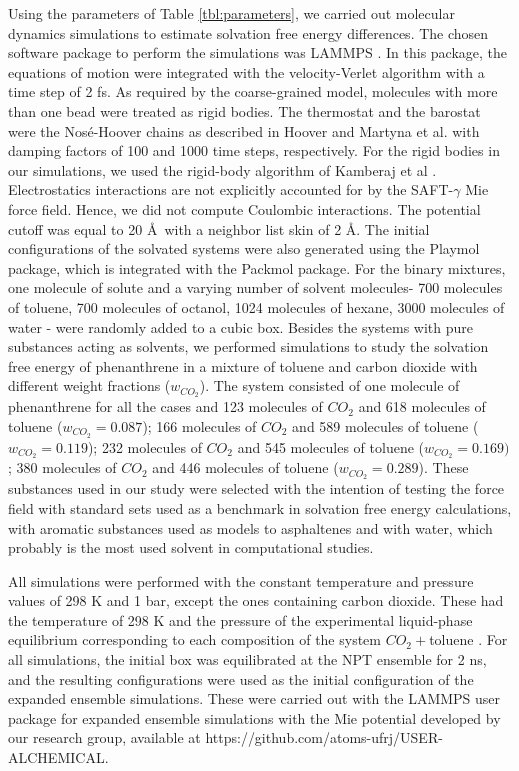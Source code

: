 \documentclass[final,12p,times,twocolumn]{elsarticle}
\begin{document}
	
	Using the parameters of Table \ref{tbl:parameters}, we carried out molecular dynamics simulations to estimate solvation free energy differences. The chosen software package to perform the simulations was LAMMPS  \cite{lammps}. In this package, the equations of motion were integrated with the velocity-Verlet algorithm \cite{verlet} with a time step of 2 fs. As required by the coarse-grained model,  molecules with more than one bead were treated as rigid bodies. The thermostat and the barostat were the Nos\'{e}-Hoover chains as described in Hoover \cite{PhysRevA.31.1695} and Martyna et al.  \cite{doi:10.1063/1.463940} with damping factors of 100 and 1000 time steps, respectively. For the rigid bodies in our simulations, we used the rigid-body algorithm of Kamberaj et al \cite{kamberaj}. Electrostatics interactions are not explicitly accounted for by the SAFT-$\gamma$ Mie force field. Hence, we did not compute Coulombic interactions. The potential cutoff was equal to 20 \AA $\,$ \cite{muller2017} with a neighbor list skin of 2 \AA. The initial configurations of the solvated systems were also generated using the Playmol package, which is integrated with the Packmol package. For the binary mixtures, one molecule of solute and a varying number of solvent molecules- 700 molecules of toluene, 700 molecules of octanol, 1024 molecules of hexane, 3000 molecules of water - were randomly added to a cubic box. Besides the systems with pure substances acting as solvents, we performed simulations to study the solvation free energy of phenanthrene in a mixture of toluene and carbon dioxide with different weight fractions ($w_{CO_{2}}$). The  system consisted of one molecule of phenanthrene for all the cases and 123 molecules of $CO_{2}$ and 618 molecules of toluene ($w_{CO_{2}} = 0.087$); 166 molecules of $CO_{2}$ and 589 molecules of toluene ($w_{CO_{2}} = 0.119$); 232 molecules of $CO_{2}$ and 545 molecules of toluene ($w_{CO_{2}} = 0.169)$; 380 molecules of $CO_{2}$ and 446 molecules of toluene ($w_{CO_{2}} = 0.289$). These substances used in our study were selected with the intention of testing the force field with standard sets used as a benchmark in solvation free energy calculations, with aromatic substances used as models to asphaltenes and with water, which probably is the most used solvent in computational studies.
	
	All simulations were performed with the constant temperature and pressure values of 298 K and 1 bar, except the ones containing carbon dioxide. These had the temperature of 298 K and the pressure of the experimental liquid-phase equilibrium corresponding to each composition of the system $CO_{2}+$toluene \cite{co2toliq}. For all simulations, the initial box was equilibrated at the NPT ensemble for 2 ns, and the resulting configurations were used as the initial configuration of the expanded ensemble simulations. These were carried out with the LAMMPS user package for expanded ensemble simulations with the Mie potential developed by our research group, available at https://github.com/atoms-ufrj/USER-ALCHEMICAL.
	
\end{document}

